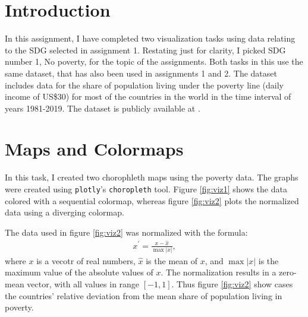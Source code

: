 \documentclass[11pt,a4paper,titlepage]{article}
\begin{document}



\section*{Introduction}
In this assignment, I have completed two visualization tasks using data relating to the SDG selected in assignment 1. Restating just for clarity, I picked SDG number 1, No poverty, for the topic of the assignments. Both tasks in this use the same dataset, that has also been used in assignments 1 and 2. The dataset includes data for the share of population living under the poverty line (daily income of US\$30) for most of the countries in the world in the time interval of years 1981-2019. The dataset is publicly available at \cite{data}.

\section{Maps and Colormaps}

In this task, I created two chorophleth maps using the poverty data. The graphs were created using \texttt{plotly}'s \texttt{choropleth} tool. Figure \ref{fig:viz1} shows the data colored with a sequential colormap, whereas figure \ref{fig:viz2} plots the normalized data using a diverging colormap. 

The data used in figure \ref{fig:viz2} was normalized with the formula:
\begin{align*}
x^{\prime} = \frac{x - \hat{x}}{\max{|x|}},
\end{align*}
where $x$ is a vecotr of real numbers, $\hat{x}$ is the mean of $x$, and $\max{|x|}$ is the maximum value of the absolute values of $x$. The normalization results in a zero-mean vector, with all values in range $[-1, 1]$. Thus figure \ref{fig:viz2} show cases the countries' relative deviation from the mean share of population living in poverty.
\end{document}
